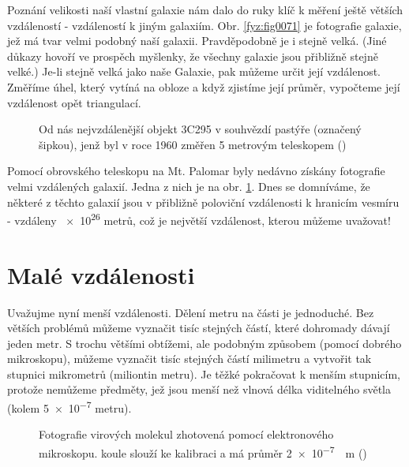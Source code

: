     Poznání velikosti naší vlastní galaxie nám dalo do ruky klíč k měření ještě větších vzdáleností 
    - vzdáleností k jiným galaxiím. Obr. \ref{fyz:fig0071} je fotografie galaxie, jež má tvar velmi 
    podobný naší galaxii. Pravděpodobně je i stejně velká. (Jiné důkazy hovoří ve prospěch 
    myšlenky, že všechny galaxie jsou přibližně stejně velké.) Je-li stejně velká jako naše 
    Galaxie, pak můžeme určit její vzdálenost. Změříme úhel, který vytíná na obloze a když zjistíme 
    její průměr, vypočteme její vzdálenost opět triangulací.

    \begin{figure}[ht!]  %
      \centering
      \caption{Od nás nejvzdálenější objekt 3C295 v souhvězdí pastýře (označený šipkou), jenž byl v 
               roce \num{1960} změřen \num{5} metrovým teleskopem (\cite[s.~73]{Feynman01})}
      \label{fyz:fig0072}
    \end{figure}
    
    Pomocí obrovského teleskopu na Mt. Palomar byly nedávno získány fotografie velmi vzdálených 
    galaxií. Jedna z nich je na obr. \ref{fyz:fig0072}. Dnes se domníváme, že některé z těchto 
    galaxií jsou v přibližně poloviční vzdálenosti k hranicím vesmíru - vzdáleny \num{e26} metrů, 
    což je největší vzdálenost, kterou můžeme uvažovat!
    
  \section{Malé vzdálenosti}
    Uvažujme nyní menší vzdálenosti. Dělení metru na části je jednoduché. Bez větších problémů 
    můžeme vyznačit tisíc stejných částí, které dohromady dávají jeden metr. S trochu většími 
    obtížemi, ale podobným způsobem (pomocí dobrého mikroskopu), můžeme vyznačit tisíc stejných 
    částí milimetru a vytvořit tak stupnici mikrometrů (miliontin metru). Je těžké pokračovat k 
    menším stupnicím, protože nemůžeme  předměty, jež jsou menší než vlnová délka 
    viditelného světla (kolem \num{5e-7} metru).

    \begin{figure}[ht!]  %
      \centering
      \caption{Fotografie virových molekul zhotovená pomocí elektronového mikroskopu.  
               koule slouží ke kalibraci a má průměr \protect\SI{2e-7}{\protect\m}
               (\cite[s.~74]{Feynman01})}
      \label{fyz:fig0073}
    \end{figure}
    
